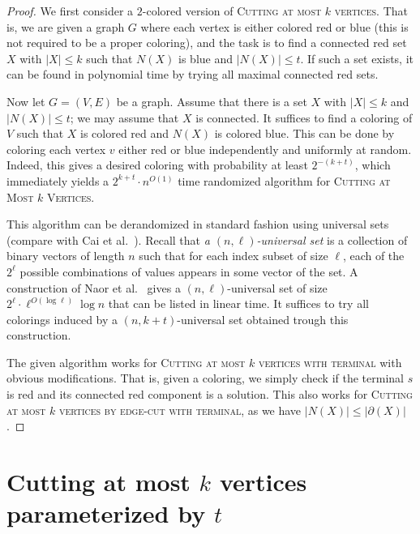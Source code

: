 \documentclass[a4paper,11pt]{article}
\theoremstyle{definition}
\theoremstyle{remark}
\newcommand{\card}[1]{\left\lvert {#1} \right\rvert}
\newcommand{\vbound}[1]{\card{N(#1)}}
\newcommand{\ebound}[1]{\card{\partial(#1)}}
\begin{document}
\begin{proof}
We first consider a $2$-colored version of \textsc{Cutting at most $k$ vertices}. That is, we are given a graph $G$ where each vertex is either colored red or blue (this is not required to be a proper coloring), and the task is to find a connected red set $X$ with $\card{X} \le k$ such that $N(X)$ is blue and $\vbound{X} \le t$. If such a set exists, it can be found in polynomial time by trying all maximal connected red sets.

Now let $G = (V,E)$ be a graph. Assume that there is a set $X$ with $\card{X} \le k$ and $\vbound{X} \le t$; we may assume that $X$ is connected. It suffices to find a coloring of $V$ such that $X$ is colored red and $N(X)$ is colored blue. This can be done by coloring each vertex $v$ either red or blue independently and uniformly at random. Indeed, this gives a desired coloring with probability at least $2^{-(k+t)}$, which immediately yields a $2^{k+t}\cdot n^{O(1)}$ time randomized algorithm for \textsc{Cutting at Most  $k$ Vertices}.

This algorithm can be derandomized in standard fashion using universal sets (compare with Cai et al.~\cite{cai2006random}). Recall that \emph{a $(n,\ell)$-universal set} is a collection of binary vectors of length $n$ such that for each index subset of size $\ell$, each of the $2^\ell$ possible combinations of values appears in some vector of the set. A construction of Naor et al.~\cite{naor1995splitters} gives a $(n,\ell)$-universal set of size $2^\ell\cdot \ell^{O(\log \ell)} \log n$ that can be listed in linear time. It suffices to try all colorings induced by a $(n,k+t)$-universal set obtained trough this construction. 

The given algorithm works for \textsc{Cutting at most  $k$ vertices with terminal}  with obvious modifications. That is, given a coloring, we simply check if the terminal $s$ is red and its connected red component is a solution. This also works for \textsc{Cutting at most  $k$ vertices by edge-cut with terminal}, as we have $\vbound{X} \le \ebound{X}$.
\end{proof}







\section{Cutting at most  $k$ vertices parameterized by $t$}
\end{document}

